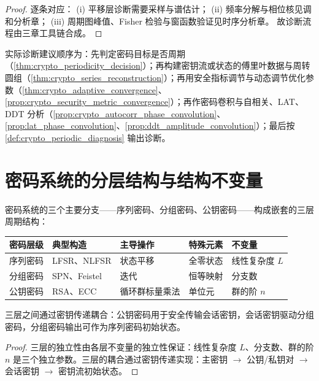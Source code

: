 \begin{proof}
逐条对应：
(i) 平移层诊断需要采样与谱估计；
(ii) 频率分解与相位核见调和分析章；
(iii) 周期图峰值、Fisher 检验与窗函数验证见时序分析章。
故诊断流程由三章工具链合成。
\end{proof}

\begin{remark}[整合后的操作顺序]\label{rem:crypto_integration_order}
实际诊断建议顺序为：先判定密码目标是否周期（\cref{thm:crypto_periodicity_decision}）；再构建密钥流或状态的傅里叶数据与周转圆组（\cref{thm:crypto_series_reconstruction}）；再用安全指标调节与动态调节优化参数（\cref{thm:crypto_adaptive_convergence}、\cref{prop:crypto_security_metric_convergence}）；再作密码卷积与自相关、LAT、DDT 分析（\cref{prop:crypto_autocorr_phase_convolution}、\cref{prop:lat_phase_convolution}、\cref{prop:ddt_amplitude_convolution}）；最后按 \cref{def:crypto_periodic_diagnosis} 输出诊断。
\end{remark}

\section{密码系统的分层结构与结构不变量}
\label{sec:crypto_layers_and_invariants}

\begin{theorem}[密码系统的三层结构]\label{thm:crypto_three_layer_structure}
密码系统的三个主要分支——序列密码、分组密码、公钥密码——构成嵌套的三层周期结构：
\begin{center}
\begin{tabular}{>{\centering\arraybackslash}p{2.5cm}>{\centering\arraybackslash}p{2.5cm}>{\centering\arraybackslash}p{2cm}>{\centering\arraybackslash}p{2.5cm}>{\centering\arraybackslash}p{2.5cm}}
\toprule
密码层级 & 典型构造 & 主导操作 & 特殊元素 & 不变量 \\
\midrule
序列密码 & LFSR、NLFSR & 状态平移 & 全零状态 & 线性复杂度 \(L\) \\
分组密码 & SPN、Feistel & 迭代 & 恒等映射 & 分支数 \\
公钥密码 & RSA、ECC & 循环群标量乘法 & 单位元 & 群的阶 \(n\) \\
\bottomrule
\end{tabular}
\end{center}
三层之间通过密钥传递耦合：公钥密码用于安全传输会话密钥，会话密钥驱动分组密码，分组密码输出可作为序列密码初始状态。
\end{theorem}

\begin{proof}
三层的独立性由各层不变量的独立性保证：线性复杂度 \(L\)、分支数、群的阶 \(n\) 是三个独立参数。三层的耦合通过密钥传递实现：主密钥 \(\to\) 公钥/私钥对 \(\to\) 会话密钥 \(\to\) 密钥流初始状态。
\end{proof}

